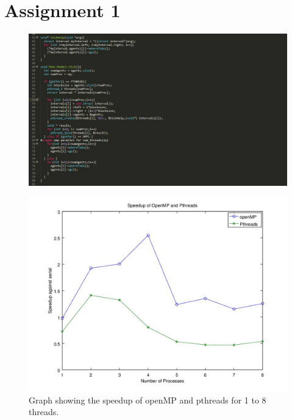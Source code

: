 \documentclass{beamer}
\title[Crisis] %
{}
\author[]{\small Markus Palacios \\ \emph{markus.palacios.5737@student.uu.se} \\ \and Jonathan Sharyari \\ \emph{jonathan.sharyari.0152@student.uu.se} \\  Peng Sun\\\emph{peng.sun.8197@student.uu.se}}
\subtitle{Project Presentation}
\date[2015-03-13] %
{March $13^{th}$, 2015}
\institute[Dept. of Information Technology] %
{
	Department of Information Technology\\
		Uppsala University
}
\begin{document}
\begin{frame}[plain]
\titlepage
\end{frame}

\section{Assignment 1}
\begin{frame}
	\begin{figure}[h!]
	\includegraphics[width=\textwidth]{code.jpg}
	\end{figure}
\end{frame}

\begin{frame}
	\begin{figure}[h!]
	\includegraphics[width=\textwidth]{lab1graph.jpg}
	\caption{Graph showing the speedup of openMP and pthreads for 1 to 8 threads.}
	\end{figure}
\end{frame}
\end{document}
